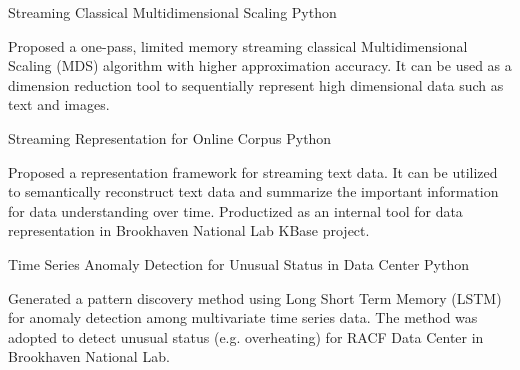 


\begin{cventries}


\projentry
{Streaming Classical Multidimensional Scaling} %
{Python} %
{ %
\begin{cvitems}
\item{Proposed a one-pass, limited memory streaming classical Multidimensional Scaling ({MDS}) algorithm with higher approximation accuracy. It can be used as a dimension reduction tool to sequentially represent high dimensional data such as text and images.}
\end{cvitems}
}


\projentry
{Streaming Representation for Online Corpus} %
{Python} %
{ %
\begin{cvitems}
\item{Proposed a representation framework for streaming text data. It can be utilized to semantically reconstruct text data and summarize the important information for data understanding over time. Productized as an internal tool for data representation in Brookhaven National Lab KBase project.}
\end{cvitems}
}


\projentry
{Time Series Anomaly Detection for Unusual Status in Data Center} %
{Python} %
{ %
\begin{cvitems}
\item{Generated a pattern discovery method using Long Short Term Memory ({LSTM}) for anomaly detection among multivariate time series data. The method was adopted to detect unusual status (e.g. overheating) for RACF Data Center in Brookhaven National Lab.}
\end{cvitems}
}


\end{cventries}
